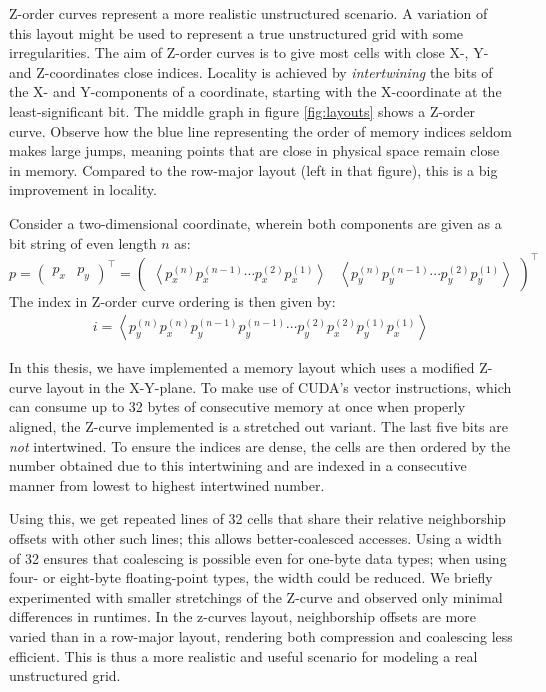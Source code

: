 Z-order curves\cite{wiki:z-curves} represent a more realistic unstructured scenario. A variation of this layout might be used to represent a true unstructured grid with some irregularities. The aim of Z-order curves is to give most cells with close X-, Y- and Z-coordinates close indices. Locality is achieved by \emph{intertwining} the bits of the X- and Y-components of a coordinate, starting with the X-coordinate at the least-significant bit. The middle graph in figure \ref{fig:layouts} shows a Z-order curve. Observe how the blue line representing the order of memory indices seldom makes large jumps, meaning points that are close in physical space remain close in memory. Compared to the row-major layout (left in that figure), this is a big improvement in locality.

Consider a two-dimensional coordinate, wherein both components are given as a bit string of even length $n$ as:
$$p=\begin{pmatrix}p_x & p_y\end{pmatrix}^\top=\begin{pmatrix}\left\langle p_x^{(n)} p_x^{(n-1)} \cdots p_x^{(2)} p_x^{(1)} \right\rangle & \left\langle p_y^{(n)} p_y^{(n-1)} \cdots p_y^{(2)} p_y^{(1)} \right\rangle\end{pmatrix}^\top$$
The index in Z-order curve ordering is then given by:
\begin{gather}
    i = \left\langle p_y^{(n)} p_x^{(n)} p_y^{(n-1)} p_y^{(n-1)} \cdots p_y^{(2)} p_x^{(2)} p_y^{(1)} p_x^{(1)}\right\rangle
\end{gather}

In this thesis, we have implemented a memory layout which uses a modified Z-curve layout in the X-Y-plane. To make use of CUDA's vector instructions, which can consume up to 32 bytes of consecutive memory at once when properly aligned, the Z-curve implemented is a stretched out variant. The last five bits are \emph{not} intertwined. To ensure the indices are dense, the cells are then ordered by the number obtained due to this intertwining and are indexed in a consecutive manner from lowest to highest intertwined number.

Using this, we get repeated lines of 32 cells that share their relative neighborship offsets with other such lines; this allows better-coalesced accesses. Using a width of 32 ensures that coalescing is possible even for one-byte data types; when using four- or eight-byte floating-point types, the width could be reduced. We briefly experimented with smaller stretchings of the Z-curve and observed only minimal differences in runtimes. In the z-curves layout, neighborship offsets are more varied than in a row-major layout, rendering both compression and coalescing less efficient. This is thus a more realistic and useful scenario for modeling a real unstructured grid.

